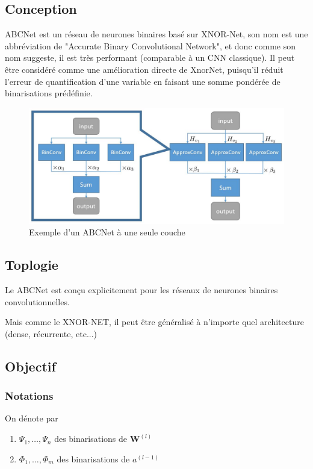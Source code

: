 \subsection{Conception}
ABCNet\cite{ABCNetPaper} est un réseau de neurones binaires basé sur XNOR-Net, son nom est une abbréviation de "Accurate Binary Convolutional Network", et donc comme son nom suggeste, il est très performant (comparable à un CNN classique). 
\newline Il peut être considéré comme une amélioration directe de XnorNet, puisqu'il réduit l'erreur de quantification d'une variable en faisant une somme pondérée de binarisations prédéfinie.
\begin{figure}[h!]
	\centering
	\includegraphics[width=\textwidth]{Figures/ABCNet.png}
	\caption{Exemple d'un ABCNet à une seule couche}
	\label{fig:ABCNet}
\end{figure}
\subsection{Toplogie}
Le ABCNet\cite{ABCNetPaper} est conçu explicitement pour les réseaux de neurones binaires convolutionnelles. 

Mais comme le XNOR-NET, il peut être généralisé à n'importe quel architecture (dense, récurrente, etc...)
\subsection{Objectif}
\subsubsection{Notations}
On dénote par
\begin{enumerate}
	\item $\Psi_1,\dots,\Psi_n$ des binarisations de  $\boldsymbol{W}^{(l)}$
	\item $\Phi_1,\dots,\Phi_m$ des binarisations de  $a^{(l-1)}$
\end{enumerate}
